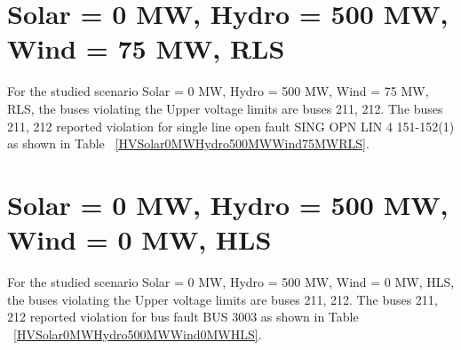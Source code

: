 \documentclass[10pt]{report}
\begin{document}
\section{Solar = 0 MW, Hydro = 500 MW, Wind = 75 MW, RLS}
For the studied scenario Solar = 0 MW, Hydro = 500 MW, Wind = 75 MW, RLS, the buses violating the Upper voltage limits are buses 211, 212.
The buses 211, 212 reported violation for single line open fault SING OPN LIN   4 151-152(1) as shown in Table ~\ref{HVSolar0MWHydro500MWWind75MWRLS}.
\begin{table}[H]
\caption{Contingencies reporting bus voltages greater than emergency voltage of 1.1 PU for scenario Solar = 0 MW, Hydro = 500 MW, Wind = 75 MW, RLS}
\label{HVSolar0MWHydro500MWWind75MWRLS}
\centering
{}
\end{table}


\section{Solar = 0 MW, Hydro = 500 MW, Wind = 0 MW, HLS}
For the studied scenario Solar = 0 MW, Hydro = 500 MW, Wind = 0 MW, HLS, the buses violating the Upper voltage limits are buses 211, 212.
The buses 211, 212 reported violation for bus fault BUS 3003 as shown in Table ~\ref{HVSolar0MWHydro500MWWind0MWHLS}.
\begin{table}[H]
\caption{Contingencies reporting bus voltages greater than emergency voltage of 1.1 PU for scenario Solar = 0 MW, Hydro = 500 MW, Wind = 0 MW, HLS}
\label{HVSolar0MWHydro500MWWind0MWHLS}
\centering
{}
\end{table}
\end{document}
